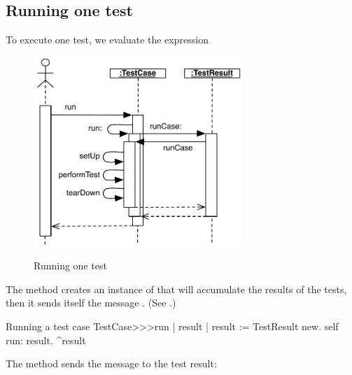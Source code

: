 \documentclass[a4paper,10pt,twoside]{book}
\begin{document}
\subsection{Running one test}

To execute one test, we evaluate the expression


\begin{figure}[tbh]
  \begin{center}
		{\includegraphics[width=0.7\textwidth]{sunit-scenario}}
	\caption{Running one test}
  \end{center}
\end{figure}

The method  creates an instance of
 that will accumulate the results of the
tests, then it sends itself the message .
(See .)

\begin{method}[tastecaserun]{Running a test case}
TestCase>>>run
	| result |
	result := TestResult new.
	self run: result.
	^result
\end{method}


The method
 sends the message
 to the test result:
\end{document}
